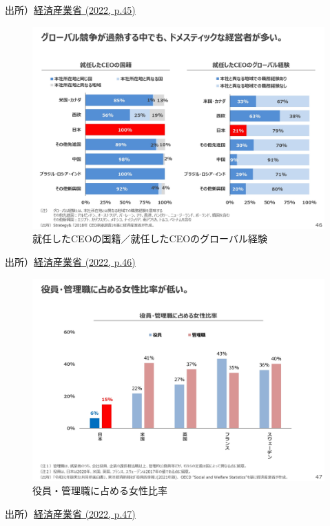 \documentclass[
]{book}
\begin{document}
出所）\href{https://www.meti.go.jp/press/2022/05/20220531001/20220531001-1.pdf}{経済産業省 (2022, p.45)}

\begin{figure}
\includegraphics[width=960px]{miti_page-0047} \caption{就任したCEOの国籍／就任したCEOのグローバル経験}\label{fig:JPceo2}
\end{figure}

出所）\href{https://www.meti.go.jp/press/2022/05/20220531001/20220531001-1.pdf}{経済産業省 (2022, p.46)}

\begin{figure}
\includegraphics[width=960px]{miti_page-0048} \caption{役員・管理職に占める女性比率}\label{fig:femaleexective}
\end{figure}

出所）\href{https://www.meti.go.jp/press/2022/05/20220531001/20220531001-1.pdf}{経済産業省 (2022, p.47)}
\end{document}
